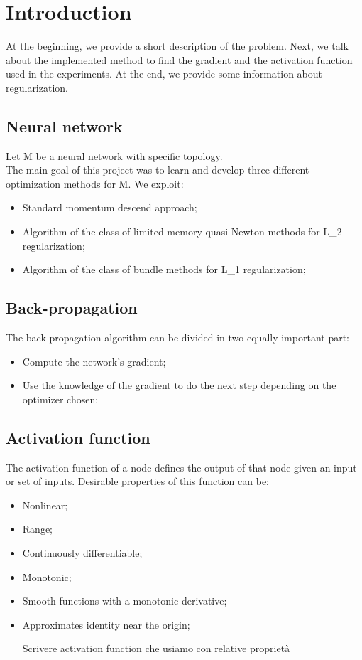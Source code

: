 \section{Introduction}
At the beginning, we provide a short description of the problem. Next, we talk about the implemented method to find the gradient and the activation function used in the experiments. At the end, we provide some information about regularization.
\subsection{Neural network}
Let M be a neural network with specific topology.
\\
The main goal of this project was to learn and develop three different optimization methods for M.
We exploit:
\begin{itemize}
	\item Standard momentum descend approach;
	\item Algorithm of the class of limited-memory quasi-Newton methods for L\_2 regularization;
	\item Algorithm of the class of bundle methods for L\_1 regularization;
\end{itemize}
\subsection{Back-propagation}
The back-propagation algorithm can be divided in two equally important part:
\begin{itemize}
	\item Compute the network's gradient;
	\item Use the knowledge of the gradient to do the next step depending on the optimizer chosen;
\end{itemize}
\subsection{Activation function}
The activation function of a node defines the output of that node given an input or set of inputs. 
Desirable properties of this function can be:
\begin{itemize}
	\item Nonlinear;
	\item Range;
	\item Continuously differentiable;
	\item Monotonic;
	\item Smooth functions with a monotonic derivative;
	\item Approximates identity near the origin;

Scrivere activation function che usiamo con relative proprietà
\end{itemize}

